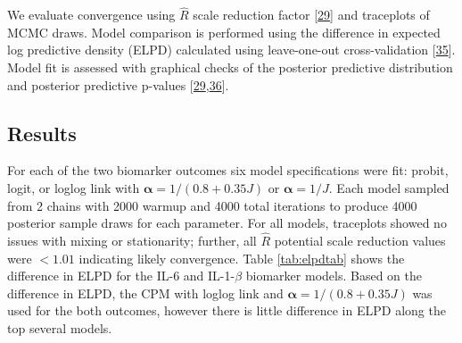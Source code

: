\documentclass[
]{article}
\begin{document}
We evaluate convergence using \(\hat{R}\) scale reduction factor {[}\protect\hyperlink{ref-gelman_bayesian_2014}{29}{]} and traceplots of MCMC draws. Model comparison is performed using the difference in expected log predictive density (ELPD) calculated using leave-one-out cross-validation {[}\protect\hyperlink{ref-vehtari_practical_2017}{35}{]}. Model fit is assessed with graphical checks of the posterior predictive distribution and posterior predictive p-values {[}\protect\hyperlink{ref-gelman_bayesian_2014}{29},\protect\hyperlink{ref-stern_bayesian_2005}{36}{]}.

\hypertarget{results-1}{%
\subsection{Results}\label{results-1}}

For each of the two biomarker outcomes six model specifications were fit: probit, logit, or loglog link with \(\boldsymbol{\alpha}=1/(0.8+0.35J)\) or \(\boldsymbol{\alpha}=1/J\). Each model sampled from 2 chains with 2000 warmup and 4000 total iterations to produce 4000 posterior sample draws for each parameter. For all models, traceplots showed no issues with mixing or stationarity; further, all \(\hat{R}\) potential scale reduction values were \(<1.01\) indicating likely convergence. Table \ref{tab:elpdtab} shows the difference in ELPD for the IL-6 and IL-1-\(\beta\) biomarker models. Based on the difference in ELPD, the CPM with loglog link and \(\boldsymbol{\alpha}=1/(0.8+0.35J)\) was used for the both outcomes, however there is little difference in ELPD along the top several models.
\end{document}

